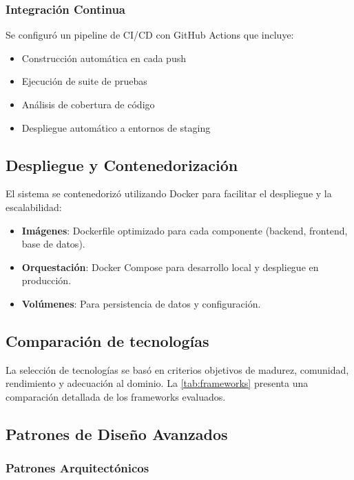 \subsubsection{Integración Continua}
Se configuró un pipeline de CI/CD con GitHub Actions que incluye:
\begin{itemize}
\item Construcción automática en cada push
\item Ejecución de suite de pruebas
\item Análisis de cobertura de código
\item Despliegue automático a entornos de staging
\end{itemize}

\subsection{Despliegue y Contenedorización}

El sistema se contenedorizó utilizando Docker para facilitar el despliegue y la escalabilidad:

\begin{itemize}
\item \textbf{Imágenes}: Dockerfile optimizado para cada componente (backend, frontend, base de datos).
\item \textbf{Orquestación}: Docker Compose para desarrollo local y despliegue en producción.
\item \textbf{Volúmenes}: Para persistencia de datos y configuración.
\end{itemize}

\subsection{Comparación de tecnologías}

La selección de tecnologías se basó en criterios objetivos de madurez, comunidad, rendimiento y adecuación al dominio. La \cref{tab:frameworks} presenta una comparación detallada de los frameworks evaluados.



\subsection{Patrones de Diseño Avanzados}

\subsubsection{Patrones Arquitectónicos}

